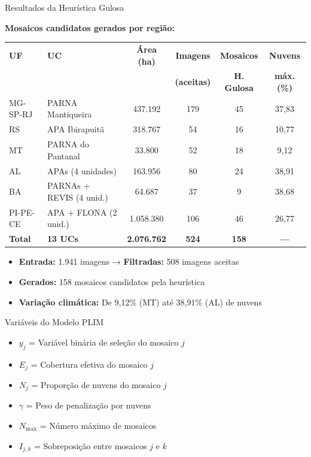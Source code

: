 \documentclass[aspectratio=169,11pt]{beamer}
\begin{document}
\begin{frame}{Resultados da Heurística Gulosa}
\vspace{-0.3cm}
\begin{center}
\textbf{Mosaicos candidatos gerados por região:}
\end{center}

\begin{center}
\footnotesize
\begin{tabular}{llcccc}
\toprule
\textbf{UF} & \textbf{UC} & \textbf{Área (ha)} & \textbf{Imagens} & \textbf{Mosaicos} & \textbf{Nuvens} \\
 & & & \textbf{(aceitas)} & \textbf{H. Gulosa} & \textbf{máx. (\%)} \\
\midrule
MG-SP-RJ & PARNA Mantiqueira & 437.192 & 179 & 45 & 37,83 \\
RS & APA Ibirapuitã & 318.767 & 54 & 16 & 10,77 \\
MT & PARNA do Pantanal & 33.800 & 52 & 18 & 9,12 \\
AL & APAs (4 unidades) & 163.956 & 80 & 24 & 38,91 \\
BA & PARNAs + REVIS (4 unid.) & 64.687 & 37 & 9 & 38,68 \\
PI-PE-CE & APA + FLONA (2 unid.) & 1.058.380 & 106 & 46 & 26,77 \\
\midrule
\textbf{Total} & \textbf{13 UCs} & \textbf{2.076.762} & \textbf{524} & \textbf{158} & \textbf{---} \\
\bottomrule
\end{tabular}
\end{center}

\vspace{0.3cm}
\begin{itemize}
\item \textbf{Entrada:} 1.941 imagens → \textbf{Filtradas:} 508 imagens aceitas
\item \textbf{Gerados:} 158 mosaicos candidatos pela heurística
\item \textbf{Variação climática:} De 9,12\% (MT) até 38,91\% (AL) de nuvens
\end{itemize}
\end{frame}

\begin{frame}{Variáveis do Modelo PLIM}
\vspace{-0.2cm}
    \begin{itemize}
        \item $y_j$ = Variável binária de seleção do mosaico $j$
        \item $E_j$ = Cobertura efetiva do mosaico $j$
        \item $N_j$ = Proporção de nuvens do mosaico $j$
        \item $\gamma$ = Peso de penalização por nuvens
        \item $N_{\max}$ = Número máximo de mosaicos
        \item $I_{j,k}$ = Sobreposição entre mosaicos $j$ e $k$
    \end{itemize}
\end{frame}
\end{document}
